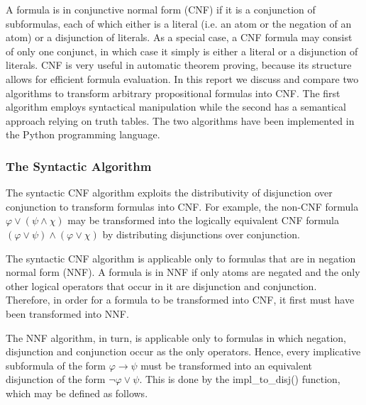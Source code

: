 \documentclass[a4paper,notitlepage]{scrartcl}
\let\phi\varphi
\begin{document}
A formula is in conjunctive normal form (CNF) if it is a conjunction of
subformulas, each of which either is a literal (i.e. an atom or the negation of
an atom) or a disjunction of literals.
As a special case, a CNF formula may consist of only one conjunct, in which
case it simply is either a literal or a disjunction of literals. 
CNF is very useful in automatic theorem proving, because its structure allows
for efficient formula evaluation.
In this report we discuss and compare two algorithms to transform arbitrary
propositional formulas into CNF.
The first algorithm employs syntactical manipulation while the second has a
semantical approach relying on truth tables.
The two algorithms have been implemented in the Python programming language.

\subsubsection{The Syntactic Algorithm}

The syntactic CNF algorithm exploits the distributivity of disjunction over
conjunction to transform formulas into CNF.
For example, the non-CNF formula $\phi \lor (\psi \land \chi)$ may be
transformed into the logically equivalent CNF formula $(\phi \lor \psi) \land
(\phi \lor \chi)$ by distributing disjunctions over conjunction.

The syntactic CNF algorithm is applicable only to formulas that are in negation
normal form (NNF).
A formula is in NNF if only atoms are negated and the only other logical
operators that occur in it are disjunction and conjunction.
Therefore, in order for a formula to be transformed into CNF, it first must
have been transformed into NNF.

The NNF algorithm, in turn, is applicable only to formulas in which negation,
disjunction and conjunction occur as the only operators.
Hence, every implicative subformula of the form $\phi \to \psi$ must be
transformed into an equivalent disjunction of the form $\lnot\phi \lor \psi$.
This is done by the impl\_to\_disj() function, which may be defined as follows.
\end{document}
